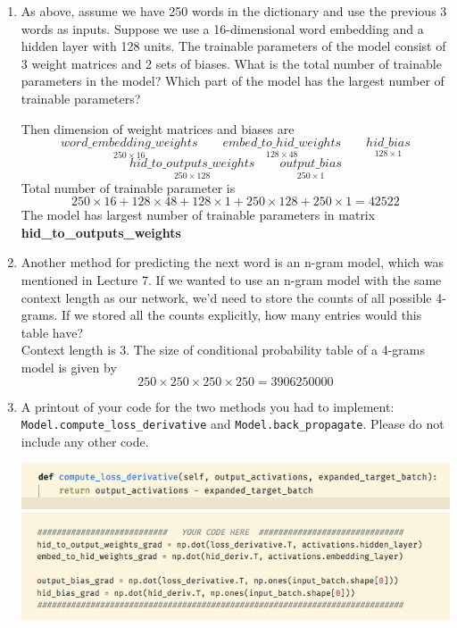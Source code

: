 \documentclass[11pt]{article}
\begin{document}
\begin{enumerate}
    \item As above, assume we have 250 words in the dictionary and use the previous 3 words as inputs. Suppose we use a 16-dimensional word embedding and a hidden layer with 128 units. The trainable parameters of the model consist of 3 weight matrices and 2 sets of biases. What is the total number of trainable parameters in the model? Which part of the model has the largest number of trainable parameters?
    \begin{solution}
        Then dimension of weight matrices and biases are 
        \[
            \underset{250\times 16}{word\_embedding\_weights}
            \quad \quad 
            \underset{128\times 48}{embed\_to\_hid\_weights}
            \quad \quad 
            \underset{128\times 1}{hid\_bias}
        \]
        \[
            \underset{250\times 128}{hid\_to\_outputs\_weights}
            \quad \quad 
            \underset{250\times 1}{output\_bias}    
        \]
        Total number of trainable parameter is 
        \[
            250\times 16 + 128 \times 48 + 128 \times 1 + 250 \times 128 + 250 \times 1 = 42522
        \]
        The model has largest number of trainable parameters in matrix \textbf{hid\_to\_outputs\_weights}
    \end{solution}
    \item Another method for predicting the next word is an n-gram model, which was mentioned in Lecture 7. If we wanted to use an n-gram model with the same context length as our network, we’d need to store the counts of all possible 4-grams. If we stored all the counts explicitly, how many entries would this table have? \\ 
    Context length is 3. The size of conditional probability table of a 4-grams model is given by
    \[
        250  \times 250 \times 250 \times 250 = 3906250000
    \]
    \item A printout of your code for the two methods you had to implement: \texttt{Model.compute\_loss\_derivative} and \texttt{Model.back\_propagate}. Please do not include any other code. 
    \begin{center}
        \includegraphics[width=15cm]{codeblock1.png}
        \includegraphics[width=15cm]{codeblock2.png}

\end{center}
\end{enumerate}
\end{document}
